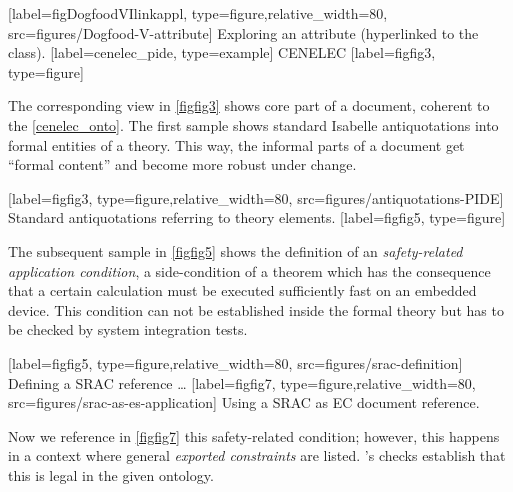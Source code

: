 \begin{isabellebody}
%
[label={figDogfoodVIlinkappl}, type={figure},relative_width={80},
        src={figures/Dogfood-V-attribute}]%
{Exploring an attribute (hyperlinked to the class).}%
%
\isaDofSubsectionExample%
%
[label={cenelec_pide}, type={example}]%
{CENELEC}%
%
\isaDofDeclareReferenceFigure%
%
[label={figfig3}, type={figure}]%
%
\begin{isamarkuptext}%
The corresponding view in \autoref{figfig3} shows core part of a document,  
coherent to the \autoref{cenelec_onto}. The first sample shows standard Isabelle antiquotations 
\cite{wenzel:isabelle-isar:2017} into formal entities of a theory. This way, the informal parts 
of a document get ``formal content'' and become more robust under change.%
\end{isamarkuptext}\isamarkuptrue%
%
%
\isaDofFigure%
%
[label={figfig3}, type={figure},relative_width={80},
      src={figures/antiquotations-PIDE}]%
{Standard antiquotations referring to theory elements.}%
%
\isaDofDeclareReferenceFigure%
%
[label={figfig5}, type={figure}]%
%
\begin{isamarkuptext}%
The subsequent sample in \autoref{figfig5} shows the definition of an 
\emph{safety-related application condition}, a side-condition of a theorem which 
has the consequence that a certain calculation must be executed sufficiently fast on an embedded 
device. This condition can not be established inside the formal theory but has to be 
checked by system integration tests.%
\end{isamarkuptext}\isamarkuptrue%
%
%
\isaDofFigure%
%
[label={figfig5}, type={figure},relative_width={80},
        src={figures/srac-definition}]%
{Defining a SRAC reference \ldots}%
%
\isaDofFigure%
%
[label={figfig7}, type={figure},relative_width={80},
        src={figures/srac-as-es-application}]%
{Using a SRAC as EC document reference.}%
%
\begin{isamarkuptext}%
Now we reference in \autoref{figfig7} this safety-related condition; 
however, this happens in a context where general \emph{exported constraints} are listed. 
\isadof's checks establish that this is legal in the given ontology. 


\end{isamarkuptext}
\end{isabellebody}
